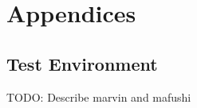 
\part{Appendices}
\label{part:appendices}

\chapter{Test Environment}
\label{chap:appendix-test-environment}

TODO: Describe marvin and mafushi

